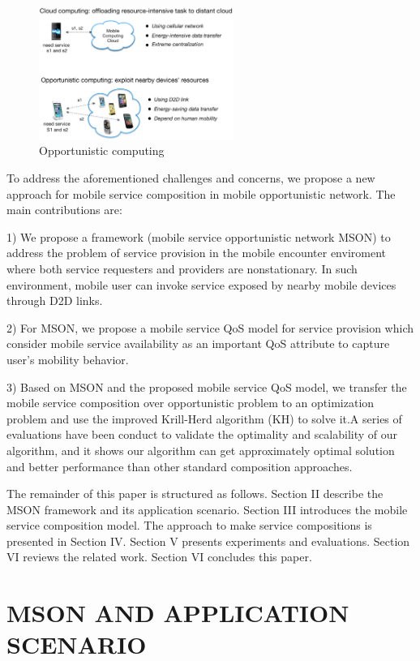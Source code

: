 \documentclass[10pt,journal,compsoc]{IEEEtran}
\begin{document}
\begin{figure}[!t]
\centering
\includegraphics[width=2.5in]{./img/fig1.jpg}
\caption{Opportunistic computing}
\label{fig_opportunistic}
\end{figure}

To address the aforementioned challenges and concerns, we propose a new approach for mobile service composition in mobile opportunistic network. The main contributions are:

1) We propose a framework (mobile service opportunistic network MSON) to address the problem of service provision in the mobile encounter enviroment where both service requesters and providers are nonstationary. In such environment, mobile user can invoke service exposed by nearby mobile devices through D2D links.

2) For MSON, we propose a mobile service QoS model for service provision which consider mobile service availability as an important QoS attribute to capture user's mobility behavior.

3) Based on MSON and the proposed mobile service QoS model, we transfer the mobile service composition over opportunistic problem to an optimization problem and use the improved Krill-Herd algorithm (KH) to solve it.A series of evaluations have been conduct to validate the optimality and scalability of our algorithm, and it shows our algorithm can get approximately optimal solution and better performance than other standard composition approaches. 

The remainder of this paper is structured as follows. Section II describe the MSON framework and its application scenario. Section III introduces the mobile service composition model. The approach to make service compositions is presented in Section IV. Section V presents experiments and evaluations. Section VI reviews the related work. Section VI concludes this paper.

\section{MSON AND APPLICATION SCENARIO}
\end{document}
